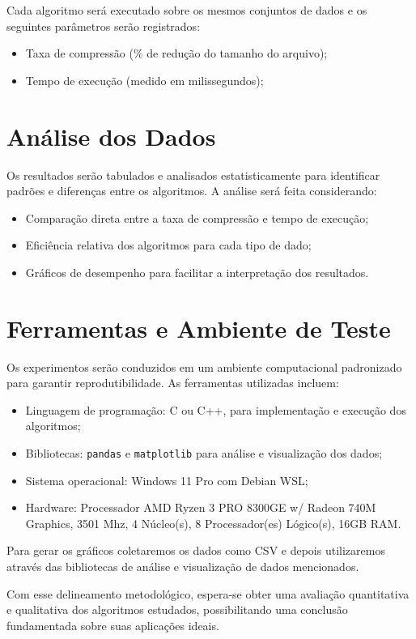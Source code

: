 Cada algoritmo será executado sobre os mesmos conjuntos de dados e os seguintes parâmetros serão registrados:

\begin{itemize}
    \item Taxa de compressão (\% de redução do tamanho do arquivo);
    \item Tempo de execução (medido em milissegundos);
\end{itemize}

\section{Análise dos Dados}

Os resultados serão tabulados e analisados estatisticamente para identificar padrões e diferenças entre os algoritmos. A análise será feita considerando:

\begin{itemize}
    \item Comparação direta entre a taxa de compressão e tempo de execução;
    \item Eficiência relativa dos algoritmos para cada tipo de dado;
    \item Gráficos de desempenho para facilitar a interpretação dos resultados.
\end{itemize}

\section{Ferramentas e Ambiente de Teste}

Os experimentos serão conduzidos em um ambiente computacional padronizado para garantir reprodutibilidade. As ferramentas utilizadas incluem:

\begin{itemize}
    \item Linguagem de programação: C ou C++, para implementação e execução dos algoritmos;
    \item Bibliotecas: \texttt{pandas} e \texttt{matplotlib} para análise e visualização dos dados;
    \item Sistema operacional: Windows 11 Pro com Debian WSL;
    \item Hardware: Processador	AMD Ryzen 3 PRO 8300GE w/ Radeon 740M Graphics, 3501 Mhz, 4 Núcleo(s), 8 Processador(es) Lógico(s), 16GB RAM.
\end{itemize}

Para gerar os gráficos coletaremos os dados como CSV e depois utilizaremos através das bibliotecas de análise e visualização de dados mencionados.

Com esse delineamento metodológico, espera-se obter uma avaliação quantitativa e qualitativa dos algoritmos estudados, possibilitando uma conclusão fundamentada sobre suas aplicações ideais.

